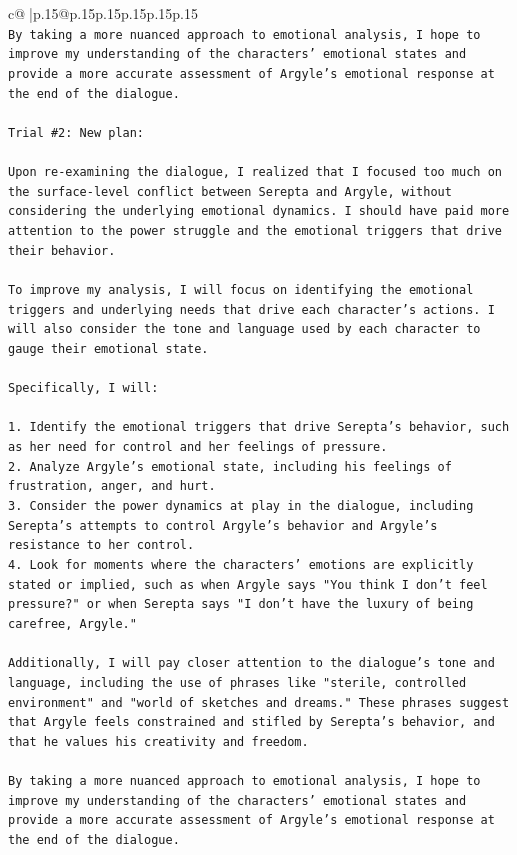 \documentclass{article}
\begin{document}
{\begin{supertabular}{c@{$\;$}|p{.15\linewidth}@{}p{.15\linewidth}p{.15\linewidth}p{.15\linewidth}p{.15\linewidth}p{.15\linewidth}}
{{{\\ 
\texttt{By taking a more nuanced approach to emotional analysis, I hope to improve my understanding of the characters' emotional states and provide a more accurate assessment of Argyle's emotional response at the end of the dialogue.} \\
\\ 
\texttt{Trial \#2: New plan: } \\
\\ 
\texttt{Upon re{-}examining the dialogue, I realized that I focused too much on the surface{-}level conflict between Serepta and Argyle, without considering the underlying emotional dynamics. I should have paid more attention to the power struggle and the emotional triggers that drive their behavior.} \\
\\ 
\texttt{To improve my analysis, I will focus on identifying the emotional triggers and underlying needs that drive each character's actions. I will also consider the tone and language used by each character to gauge their emotional state.} \\
\\ 
\texttt{Specifically, I will:} \\
\\ 
\texttt{1. Identify the emotional triggers that drive Serepta's behavior, such as her need for control and her feelings of pressure.} \\
\texttt{2. Analyze Argyle's emotional state, including his feelings of frustration, anger, and hurt.} \\
\texttt{3. Consider the power dynamics at play in the dialogue, including Serepta's attempts to control Argyle's behavior and Argyle's resistance to her control.} \\
\texttt{4. Look for moments where the characters' emotions are explicitly stated or implied, such as when Argyle says "You think I don't feel pressure?" or when Serepta says "I don't have the luxury of being carefree, Argyle."} \\
\\ 
\texttt{Additionally, I will pay closer attention to the dialogue's tone and language, including the use of phrases like "sterile, controlled environment" and "world of sketches and dreams." These phrases suggest that Argyle feels constrained and stifled by Serepta's behavior, and that he values his creativity and freedom.} \\
\\ 
\texttt{By taking a more nuanced approach to emotional analysis, I hope to improve my understanding of the characters' emotional states and provide a more accurate assessment of Argyle's emotional response at the end of the dialogue.} \\
}}}
\end{supertabular}}
\end{document}
